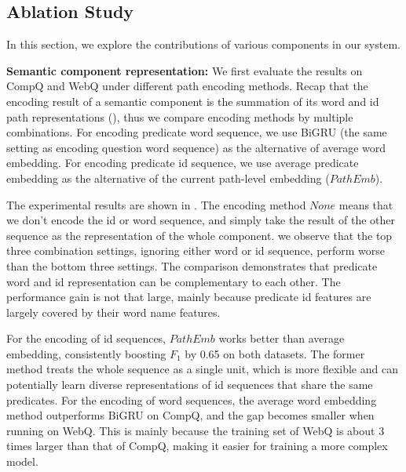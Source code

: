 \subsection{Ablation Study}
In this section, we explore the contributions of various components in our system.

\textbf{Semantic component representation:}
We first evaluate the results on CompQ and WebQ under different path encoding methods.
Recap that the encoding result of a semantic component
is the summation of its word and id path representations (),
thus we compare encoding methods by multiple combinations.
For encoding predicate word sequence, we use BiGRU
(the same setting as encoding question word sequence)
as the alternative of average word embedding.
For encoding predicate id sequence,
we use average predicate embedding as the alternative
of the current path-level embedding ($PathEmb$).

The experimental results are shown in .
The encoding method $None$ means that we don't encode the id or word sequence,
and simply take the result of the other sequence as the representation of the whole component.
we observe that the top three combination settings, 
ignoring either word or id sequence,
perform worse than the bottom three settings.
The comparison demonstrates that predicate word and id representation 
can be complementary to each other.
The performance gain is not that large,
mainly because predicate id features are largely covered by their word name features.

For the encoding of id sequences, $PathEmb$ works better than average embedding,
consistently boosting $F_1$ by 0.65 on both datasets.
The former method treats the whole sequence as a single unit,
which is more flexible and can potentially learn diverse representations
of id sequences that share the same predicates.
For the encoding of word sequences,
the average word embedding method outperforms BiGRU on CompQ,
and the gap becomes smaller when running on WebQ.
This is mainly because the training set of WebQ is about 3 times larger than that of CompQ,
making it easier for training a more complex model.
%
%
%
%

